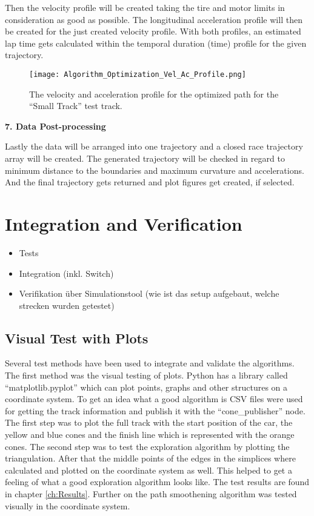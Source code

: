Then the velocity profile will be created taking the tire and motor limits in consideration as good as possible. The longitudinal acceleration profile will then be created for the just created velocity profile. With both profiles, an estimated lap time gets calculated within the temporal duration (time) profile for the given trajectory.
\begin{figure}[H]
    \centering
    \texttt{[image: Algorithm\_Optimization\_Vel\_Ac\_Profile.png]}
    \caption{The velocity and acceleration profile for the optimized path for the ``Small Track'' test track.}
    \label{fig:Optimization Algorithm Velocity and Acceleration Profile}
\end{figure}

\textbf{7. Data Post-processing}

Lastly the data will be arranged into one trajectory and a closed race trajectory array will be created. The generated trajectory will be checked in regard to minimum distance to the boundaries and maximum curvature and accelerations. And the final trajectory gets returned and plot figures get created, if selected.

\section{Integration and Verification} \label{sec:Integration and Verification}

\begin{itemize}
    \item Tests
    \item Integration (inkl. Switch)
    \item Verifikation über Simulationstool (wie ist das setup aufgebaut, welche strecken wurden getestet)
\end{itemize}

\subsection{Visual Test with Plots} \label{sec:Visual Test with Plots}
Several test methods have been used to integrate and validate the algorithms. The first method was the visual testing of plots. Python has a library called ``matplotlib.pyplot'' which can plot points, graphs and other structures on a coordinate system. To get an idea what a good algorithm is CSV files were used for getting the track information and publish it with the ``cone\_publisher'' node. The first step was to plot the full track with the start position of the car, the yellow and blue cones and the finish line which is represented with the orange cones. The second step was to test the exploration algorithm by plotting the triangulation. After that the middle points of the edges in the simplices where calculated and plotted on the coordinate system as well. This helped to get a feeling of what a good exploration algorithm looks like. The test results are found in chapter \ref{ch:Results}. Further on the path smoothening algorithm was tested visually in the coordinate system.

